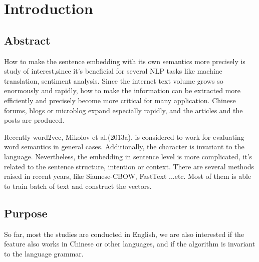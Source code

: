 \chapter{Introduction}
\setlength{\baselineskip}{1.5em}
\setlength{\parindent}{2em}
\setlength{\parskip}{1em}

\section{Abstract}

How to make the sentence embedding with its own semantics more precisely is study of interest,since it's beneficial for several NLP tasks like machine translation, sentiment analysis. Since the internet text volume grows so enormously and rapidly, how to make the information can be extracted more efficiently and precisely become more critical for many application. Chinese forums, blogs or microblog expand especially rapidly, and the articles and the posts are produced.

Recently word2vec, Mikolov et al.(2013a), is considered to work for evaluating word semantics in general cases.  Additionally, the character is invariant to the language. Nevertheless, the embedding in sentence level is more complicated, it's related to the sentence structure,  intention or context. There are several methods raised in recent years, like Siamese-CBOW, FastText ...etc. Most of them is able to train batch of text and construct the vectors.

\section{Purpose}

So far, most the studies are conducted in English, we are also interested if the feature also works in Chinese or other languages, and if the algorithm is invariant to the language grammar. 